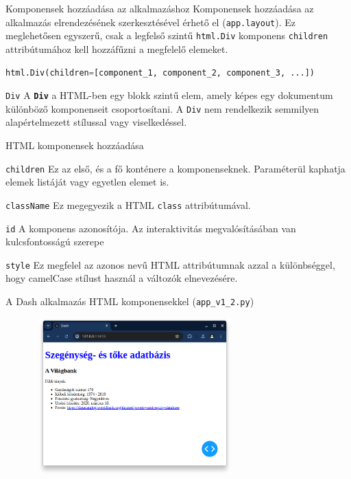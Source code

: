 \documentclass[english, aspectratio=169]{beamer}
\begin{document}
	\begin{frame}[fragile]{Komponensek hozzáadása az alkalmazáshoz}
		Komponensek hozzáadása az alkalmazás elrendezésének szerkesztésével érhető el (\texttt{app.layout}). Ez meglehetősen egyszerű, csak a legfelső szintű \texttt{html.Div} komponens \texttt{children} attribútumához kell hozzáfűzni a megfelelő elemeket.\par\smallskip
		\begin{lstlisting}[language=python]
html.Div(children=[component_1, component_2, component_3, ...])
		\end{lstlisting}
		\par\smallskip
		\begin{block}{\texttt{Div}}
			A \textbf{\texttt{Div}} a HTML-ben egy blokk szintű elem, amely képes egy dokumentum különböző komponenseit csoportosítani. A \texttt{Div} nem rendelkezik semmilyen alapértelmezett stílussal vagy viselkedéssel.
		\end{block}
	\end{frame}
	
	\begin{frame}[fragile]{HTML komponensek hozzáadása}
		\begin{block}{\texttt{children}}
			Ez az első, és a fő konténere a komponenseknek. Paraméterül kaphatja elemek listáját vagy egyetlen elemet is.
		\end{block}
		\begin{block}{\texttt{className}}
			Ez megegyezik a HTML \texttt{class} attribútumával.
		\end{block}
		\begin{block}{\texttt{id}}
			A komponens azonosítója. Az interaktivitás megvalósításában van kulcsfontosságú szerepe
		\end{block}
		\begin{block}{\texttt{style}}
			Ez megfelel az azonos nevű HTML attribútumnak azzal a különbséggel, hogy camelCase stílust használ a változók elnevezésére.
		\end{block}
	\end{frame}
	
	\begin{frame}{A Dash alkalmazás HTML komponensekkel (\texttt{app\_v1\_2.py})}
		\begin{center}
			\includegraphics[width=10cm, height=6cm, keepaspectratio]{images/dash_6.png}
		\end{center}
	\end{frame}
	
\end{document}
